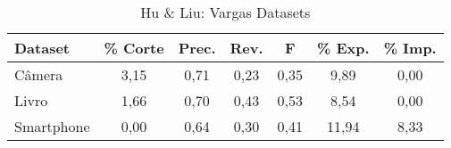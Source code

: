 \begin{table}[!htb]
\centering
\caption{Hu \& Liu: Vargas Datasets}
\label{tab:huLiuW2V}
\begin{tabular}{lcccccc}
    \hline
    Dataset &  \% Corte & Prec. & Rev. & F & \% Exp. & \% Imp.   \\ \hline
Câmera     &  3,15 &  0,71 & 0,23 & 0,35 & 9,89 & 0,00 \\
Livro      &  1,66 &  0,70 & 0,43 & 0,53 & 8,54 & 0,00 \\
Smartphone &  0,00 &  0,64 & 0,30 & 0,41 & 11,94 & 8,33 \\ \hline
\end{tabular}
\end{table}
